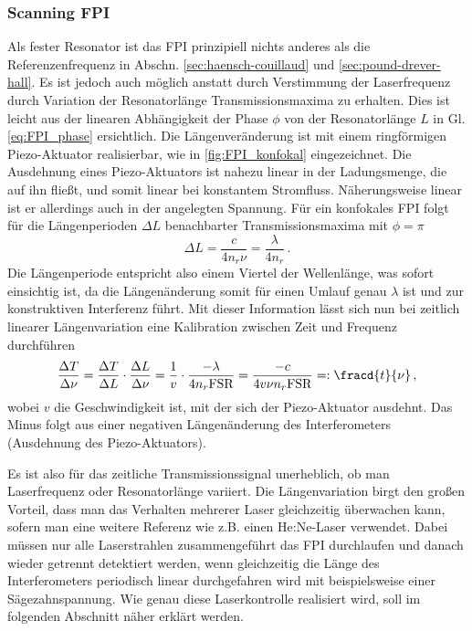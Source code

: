 \subsubsection{Scanning FPI}\label{subsubsec:scanning_FPI}
Als fester Resonator ist das FPI prinzipiell nichts anderes als die
Referenzenfrequenz in Abschn. \ref{sec:haensch-couillaud} und
\ref{sec:pound-drever-hall}. Es ist jedoch auch möglich anstatt durch
Verstimmung der Laserfrequenz durch Variation der Resonatorlänge
Transmissionsmaxima zu erhalten. Dies ist leicht aus der linearen Abhängigkeit
der Phase $\phi$ von der Resonatorlänge $L$ in Gl. \eqref{eq:FPI_phase}
ersichtlich. Die Längenveränderung ist mit einem ringförmigen Piezo-Aktuator
realisierbar, wie in \ref{fig:FPI_konfokal} eingezeichnet. Die Ausdehnung eines
Piezo-Aktuators ist nahezu linear in der Ladungsmenge, die auf ihn fließt, und
somit linear bei konstantem Stromfluss. Näherungsweise linear ist er allerdings
auch in der angelegten Spannung. Für ein konfokales FPI folgt für die Längenperioden $\Delta L$
benachbarter Transmissionsmaxima mit $\phi=\pi$
\begin{equation}\label{eq:FPI_laengenperiode}
	\Delta L=\frac{c}{4n_r\nu}=\frac{\lambda}{4n_r}\,.
\end{equation}
Die Längenperiode entspricht also einem Viertel der Wellenlänge, was sofort
einsichtig ist, da die Längenänderung somit für einen Umlauf genau $\lambda$ ist
und zur konstruktiven Interferenz führt. Mit dieser Information lässt sich nun
bei zeitlich linearer Längenvariation eine Kalibration zwischen Zeit und
Frequenz durchführen
\begin{equation}\label{eq:FPI_zeit-eichung}
	\frac{\Delta T}{\Delta\nu}=\frac{\Delta T}{\Delta L}\cdot\frac{\Delta
	L}{\Delta\nu}=\frac{1}{v}\cdot\frac{-\lambda}{4n_r\text{FSR}}=\frac{-c}{4v\nu
	n_r\text{FSR}}=:\fracd{t}{\nu}\,,
\end{equation}
wobei $v$ die Geschwindigkeit ist, mit der sich der Piezo-Aktuator ausdehnt.
Das Minus folgt aus einer negativen Längenänderung des Interferometers
(Ausdehnung des Piezo-Aktuators).\par
Es ist also für das zeitliche Transmissionssignal unerheblich, ob man
Laserfrequenz oder Resonatorlänge variiert. Die Längenvariation birgt den großen
Vorteil, dass man das Verhalten mehrerer Laser gleichzeitig überwachen kann,
sofern man eine weitere Referenz wie z.B. einen He:Ne-Laser verwendet.
Dabei müssen nur alle Laserstrahlen zusammengeführt das FPI durchlaufen und danach
wieder getrennt detektiert werden, wenn gleichzeitig die Länge des
Interferometers periodisch linear durchgefahren wird mit beispielsweise einer
Sägezahnspannung. Wie genau diese Laserkontrolle realisiert wird, soll im
folgenden Abschnitt näher erklärt werden.

